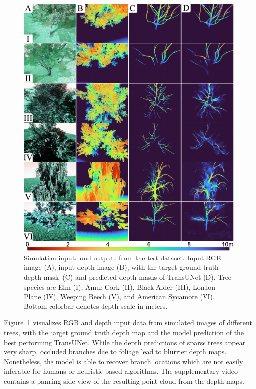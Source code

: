\begin{figure}[!t]
    \centering
    \includegraphics[width=1\columnwidth]{chapters/papers/OBR/figures/fig-4-qualitative-sim/fig-4-qualitative-sim-v05.pdf}
    \vspace{\figurevspaceabove}
    \caption{Simulation inputs and outputs from the test dataset. Input RGB image (A), input depth image (B), with the target ground truth depth \mbox{mask (C)} and predicted depth masks of TransUNet (D). Tree species are Elm (I), Amur Cork (II),  Black Alder (III), London Plane (IV), Weeping Beech (V), and American Sycamore (VI). Bottom colorbar denotes depth scale in meters.}
    \label{fig-4-qualitative-sim}
    \vspace{\figurevspacebelow}
\end{figure}


Figure~\ref{fig-4-qualitative-sim} visualizes RGB and depth input data from simulated images of different trees, with the target ground truth depth map and the model prediction  of the best performing TransUNet. While the depth predictions of sparse trees appear very sharp, occluded branches due to foliage lead to blurrier depth maps. Nonetheless, the model is able to recover branch locations which are not easily inferable for humans or heuristic-based algorithms. The supplementary video contains a panning side-view of the resulting point-cloud from the depth maps.


